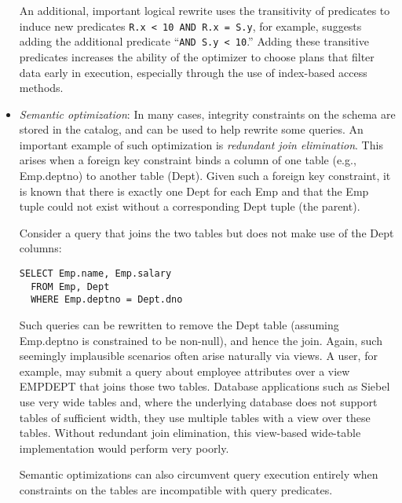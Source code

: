 \documentclass[b5paper,11pt,twoside,openright]{book}
\begin{document}
\begin{itemize}
An additional, important logical rewrite uses the transitivity of
		predicates to induce new predicates \texttt{R.x \textless{} 10 AND R.x = S.y},
		for example, suggests adding the additional predicate ``\texttt{AND S.y
		\textless{} 10}.'' Adding these transitive predicates increases the
ability of the optimizer to choose plans that filter data early in
execution, especially through the use of index-based access methods.
\item
  \emph{Semantic optimization}: In many cases, integrity constraints on
  the schema are stored in the catalog, and can be used to help rewrite
  some queries. An important example of such optimization is
  \emph{redundant join elimination}. This arises when a foreign key
  constraint binds a column of one table (e.g., Emp.deptno) to another
  table (Dept). Given such a foreign key constraint, it is known that
  there is exactly one Dept for each Emp and that the Emp tuple could
  not exist without a corresponding Dept tuple (the parent).

Consider a query that joins the two tables but does not make use of the
Dept columns:

		\begin{verbatim}
SELECT Emp.name, Emp.salary
  FROM Emp, Dept
  WHERE Emp.deptno = Dept.dno
		\end{verbatim}

Such queries can be rewritten to remove the Dept table (assuming
Emp.deptno is constrained to be non-null), and hence the join. Again,
such seemingly implausible scenarios often arise naturally via views. A
user, for example, may submit a query about employee attributes over a
view EMPDEPT that joins those two tables. Database applications such as
Siebel use very wide tables and, where the underlying database does not
support tables of sufficient width, they use multiple tables with a view
over these tables. Without redundant join elimination, this view-based
wide-table implementation would perform very poorly.

Semantic optimizations can also circumvent query execution entirely when
constraints on the tables are incompatible with query predicates.


\end{itemize}
\end{document}
